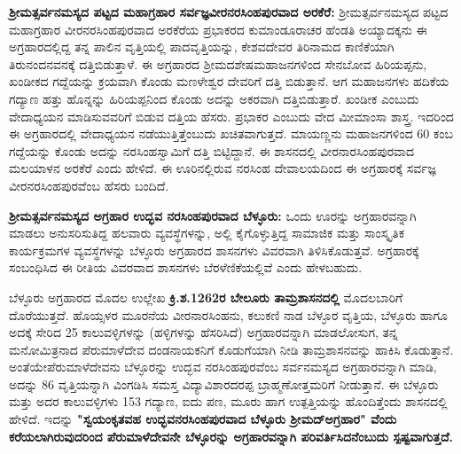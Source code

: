 \textbf{ಶ‍್ರೀಮತ್ಸರ್ವನಮಸ್ಯದ ಪಟ್ಟದ ಮಹಾಗ್ರಹಾರ \general{\enginline{-}} ಸರ್ವಜ್ಞವೀರನರಸಿಂಹಪುರವಾದ ಅರಕೆರೆ:} ಶ‍್ರೀಮತ್ಸರ್ವನಮಸ್ಯದ ಪಟ್ಟದ ಮಹಾಗ್ರಹಾರ ವೀರನರಸಿಂಹಪುರವಾದ ಅರಕೆರೆಯ ಪ್ರಭಾಕರದ ಕುಮಾಂಡೂರಾಚರ ಹೆಂಡತಿ ಅಯ್ಯಾದಕ್ಕನು ಈ ಅಗ್ರಹಾರದಲ್ಲಿದ್ದ ತನ್ನ ಪಾಲಿನ ವೃತ್ತಿಯಲ್ಲಿ ಪಾದವೃತ್ತಿಯನ್ನು, ಕೇಶವದೇವರ ತಿರಿನಾಮದ ಕಾಣಿಕೆಯಾಗಿ ತಿರುನಂದನವನಕ್ಕೆ ದತ್ತಿಬಿಡುತ್ತಾಳೆ. ಈ ಅಗ್ರಹಾರದ ಶ‍್ರೀಮದಶೇಷಮಹಾಜನಗಳಿಂದ ಸೇನಬೋವ ಹಿರಿಯಪ್ಪನು, ಖಂಡೀಕದ ಗದ್ದೆಯನ್ನು ಕ್ರಯವಾಗಿ ಕೊಂಡು ಮಣಳೇಶ್ವರ ದೇವರಿಗೆ ದತ್ತಿ ಬಿಡುತ್ತಾನೆ. ಆಗ ಮಹಾಜನಗಳು ಹದಿಕೆಯ ಗದ್ಯಾಣ ಹತ್ತು ಹೊನ್ನನ್ನು ಹಿರಿಯಪ್ಪನಿಂದ ಕೊಂಡು ಅದನ್ನು ಅಕರವಾಗಿ ದತ್ತಿಬಿಡುತ್ತಾರೆ. ಖಂಡೀಕ ಎಂಬುದು ವೇದಾಧ್ಯಯನ ಮಾಡಿಸುವವರಿಗೆ ಬಿಡುವ ದತ್ತಿಯ ಹೆಸರು. ಪ್ರಭಾಕರ ಎಂಬುದು ವೇದ ಮೀಮಾಂಸಾ ಶಾಸ್ತ್ರ. ಇದರಿಂದ ಈ ಅಗ್ರಹಾರದಲ್ಲಿ ವೇದಾಧ್ಯಯನ ನಡೆಯುತ್ತಿತ್ತೆಂಬುದು ಖಚಿತವಾಗುತ್ತದೆ. ಮಾಯಣ್ಣನು ಮಹಾಜನಗಳಿಂದ 60 ಕಂಬ ಗದ್ದೆಯನ್ನು ಕೊಂಡು ಅದನ್ನು ನರಸಿಂಹಸ್ವಾಮಿಗೆ ದತ್ತಿ ಬಿಟ್ಟಿದ್ದಾನೆ. ಈ ಶಾಸನದಲ್ಲಿ ವೀರನಾರಸಿಂಹಪುರವಾದ ಮಲಯಾಳನ ಅರಕೆರೆ ಎಂದು ಹೇಳಿದೆ. ಈ ಊರಿನಲ್ಲಿರುವ ನರಸಿಂಹ ದೇವಾಲಯದಿಂದ ಈ ಅಗ್ರಹಾರಕ್ಕೆ ಸರ್ವಜ್ಞ ವೀರನರಸಿಂಹಪುರವೆಂಬ ಹೆಸರು ಬಂದಿದೆ.

\textbf{ಶ‍್ರೀಮತ್ಸರ್ವನಮಸ್ಯದ ಅಗ್ರಹಾರ ಉದ್ಭವ ನರಸಿಂಹಪುರವಾದ ಬೆಳ್ಳೂರು:} ಒಂದು ಊರನ್ನು ಅಗ್ರಹಾರವನ್ನಾಗಿ ಮಾಡಲು ಅನುಸರಿಸುತಿದ್ದ ಹಲವಾರು ವ್ಯವಸ್ಥೆಗಳನ್ನು, ಅಲ್ಲಿ ಕೈಗೊಳ್ಳುತ್ತಿದ್ದ ಸಾಮಾಜಿಕ ಮತ್ತು ಸಾಂಸ್ಕೃತಿಕ ಕಾರ್ಯಕ್ರಮಗಳ ವ್ಯವಸ್ಥೆಗಳನ್ನು ಬೆಳ್ಳೂರು ಅಗ್ರಹಾರದ ಶಾಸನಗಳು ವಿವರವಾಗಿ ತಿಳಿಸಿಕೊಡುತ್ತವೆ. ಅಗ್ರಹಾರಕ್ಕೆ ಸಂಬಂಧಿಸಿದ ಈ ರೀತಿಯ ವಿವರವಾದ ಶಾಸನಗಳು ಬೆರಳೆಣಿಕೆಯಲ್ಲಿವೆ ಎಂದು ಹೇಳಬಹುದು.

ಬೆಳ್ಳೂರು ಅಗ್ರಹಾರದ ಮೊದಲ ಉಲ್ಲೇಖ \textbf{ಕ್ರಿ.ಶ.1262ರ ಬೇಲೂರು ತಾಮ್ರಶಾಸನದಲ್ಲಿ} ಮೊದಲಬಾರಿಗೆ ದೊರೆಯುತ್ತದೆ. ಹೊಯ್ಸಳರ ಮೂರನೆಯ ವೀರನಾರಸಿಂಹನು, ಕಲುಕಣಿ ನಾಡ ಬೆಳ್ಳೂರ ವೃತ್ತಿಯ, ಬೆಳ್ಳೂರು ಹಾಗೂ ಅದಕ್ಕೆ ಸೇರಿದ 25 ಕಾಲುವಳ್ಳಿಗಳನ್ನು (ಹಳ್ಳಿಗಳನ್ನು ಹೆಸರಿಸಿದೆ) ಅಗ್ರಹಾರವನ್ನಾಗಿ ಮಾಡಲೋಸುಗ, ತನ್ನ ಮನೋಮಿತ್ರನಾದ ಪೆರುಮಾಳೆದೇವ ದಂಡನಾಯಕನಿಗೆ ಕೊಡುಗೆಯಾಗಿ ನೀಡಿ ತಾಮ್ರಶಾಸನವನ್ನು ಹಾಕಿಸಿ ಕೊಡುತ್ತಾನೆ. ಅಂತೆಯೇ\break ಪೆರುಮಾಳೆದೇವನು ಬೆಳ್ಳೂರನ್ನು ಉದ್ಭವ ನರಸಿಂಹಪುರವೆಂಬ ಸರ್ವನಮಸ್ಯದ ಅಗ್ರಹಾರವನ್ನಾಗಿ ಮಾಡಿ, ಅದನ್ನು 86 ವೃತ್ತಿಯನ್ನಾಗಿ ವಿಂಗಡಿಸಿ ಸಮಸ್ತ ವಿದ್ಯಾವಿಶಾರದರಪ್ಪ ಬ್ರಾಹ್ಮಣೋತ್ತಮರಿಗೆ ನೀಡುತ್ತಾನೆ. ಈ ಬೆಳ್ಳೂರು ಮತ್ತು ಅದರ ಕಾಲುವಳ್ಳಿಗಳು 153 ಗದ್ಯಾಣ, ಐದು ಪಣ, ಮೂರು ಹಾಗ ಉತ್ಪತ್ತಿಯನ್ನು ಹೊಂದಿತ್ತೆಂದು ಶಾಸನದಲ್ಲಿ ಹೇಳಿದೆ. ಇದನ್ನು \textbf{"ಸ್ವಯಂಕೃತವಹ ಉದ್ಭವನರಸಿಂಹಪುರವಾದ ಬೆಳ್ಳೂರು ಶ‍್ರೀಮದ್​ಅಗ್ರಹಾರ" ವೆಂದು ಕರೆಯಲಾಗಿರುವುದರಿಂದ ಪೆರುಮಾಳೆದೇವನೇ ಬೆಳ್ಳೂರನ್ನು ಅಗ್ರಹಾರವನ್ನಾಗಿ ಪರಿವರ್ತಿಸಿದನೆಂಬುದು ಸ್ಪಷ್ಟವಾಗುತ್ತದೆ.}

